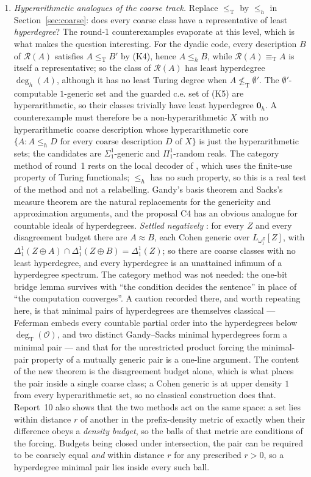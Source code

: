 \documentclass[11pt,a4paper]{article}
\newcommand{\R}{\mathcal R}
\newcommand{\leT}{\leq_{\mathrm T}}
\newcommand{\eqT}{\equiv_{\mathrm T}}
\newcommand{\degT}{\operatorname{deg}_{\mathrm T}}
\newcommand{\zero}{\mathbf0}
\theoremstyle{definition}\newtheorem{definition}[theorem]{Definition}
\theoremstyle{remark}\newtheorem{remark}[theorem]{Remark}
\begin{document}
\begin{enumerate}[label=\textup{(O\arabic*)},leftmargin=3em]
\item \emph{Hyperarithmetic analogues of the coarse track.} Replace $\leT$ by $\le_h$ in Section~\ref{sec:coarse}: does every coarse class have a representative of least \emph{hyperdegree}? The round-1 counterexamples evaporate at this level, which is what makes the question interesting. For the dyadic code, every description $B$ of $\R(A)$ satisfies $A\leT B'$ by (K4), hence $A\le_h B$, while $\R(A)\eqT A$ is itself a representative; so the class of $\R(A)$ has least hyperdegree $\deg_h(A)$, although it has no least Turing degree when $A\nleq_{\mathrm T}\emptyset'$. The $\emptyset'$-computable $1$-generic set and the guarded c.e. set of (K5) are hyperarithmetic, so their classes trivially have least hyperdegree $\zero_h$. A counterexample must therefore be a non-hyperarithmetic $X$ with no hyperarithmetic coarse description whose hyperarithmetic core $\{A:A\le_h D\text{ for every coarse description }D\text{ of }X\}$ is just the hyperarithmetic sets; the candidates are $\Sigma^1_1$-generic and $\Pi^1_1$-random reals. The category method of round~1 rests on the local decoder of \cite[Lemma 4.3]{Synthesis}, which uses the finite-use property of Turing functionals; $\le_h$ has no such property, so this is a real test of the method and not a relabelling. Gandy's basis theorem and Sacks's measure theorem are the natural replacements for the genericity and approximation arguments, and the proposal C4 has an obvious analogue for countable ideals of hyperdegrees. \emph{Settled negatively} \cite[Theorem 1.1]{ReportTen}: for every $Z$ and every disagreement budget there are $A\approx B$, each Cohen generic over $L_{\omega_1^Z}[Z]$, with $\Delta^1_1(Z\oplus A)\cap\Delta^1_1(Z\oplus B)=\Delta^1_1(Z)$; so there are coarse classes with no least hyperdegree, and every hyperdegree is an unattained infimum of a hyperdegree spectrum. The category method was not needed: the one-bit bridge lemma survives with ``the condition decides the sentence'' in place of ``the computation converges''. A caution recorded there, and worth repeating here, is that minimal pairs of hyperdegrees are themselves classical --- Feferman embeds every countable partial order into the hyperdegrees below $\degT(\mathcal O)$, and two distinct Gandy--Sacks minimal hyperdegrees form a minimal pair --- and that for the unrestricted product forcing the minimal-pair property of a mutually generic pair is a one-line argument. The content of the new theorem is the disagreement budget alone, which is what places the pair inside a single coarse class; a Cohen generic is at upper density $1$ from every hyperarithmetic set, so no classical construction does that. Report~10 also shows that the two methods act on the same space: a set lies within distance $r$ of another in the prefix-density metric of \cite{Synthesis} exactly when their difference obeys a \emph{density budget}, so the balls of that metric are conditions of the forcing. Budgets being closed under intersection, the pair can be required to be coarsely equal \emph{and} within distance $r$ for any prescribed $r>0$, so a hyperdegree minimal pair lies inside every such ball.


\end{enumerate}
\end{document}
